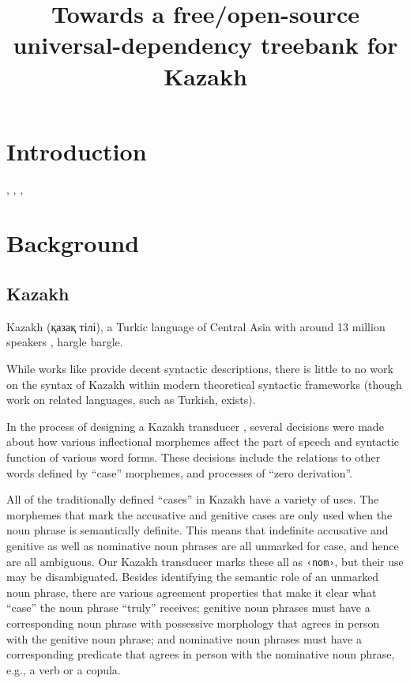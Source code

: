 \documentclass[a4paper,11pt, onecolumn,twoside]{article}
\title{Towards a free/open-source universal-dependency treebank for Kazakh}
\newcommand{\tag}[1]{\texttt{‹#1›}}
\begin{document}
\maketitleabstract{}
\thispagestyle{firststyle}

\section{Introduction}

\textcite{Lynn12}, \textcite{Atalay03}, \textcite{Oflazer03}, \textcite{DeMarneffe14}

\section{Background}

\subsection{Kazakh}\label{sec:kazakh}

Kazakh (қазақ тілі), a Turkic language of Central Asia with around 13 million speakers \parencite{ethnologue}, hargle bargle. %

While works like \textcite{Balaqayev54} provide decent syntactic descriptions, there is little to no work on the syntax of Kazakh within modern theoretical syntactic frameworks (though work on related languages, such as Turkish, exists).

In the process of designing a Kazakh transducer \parencite{Washington14}, several decisions were made about how various inflectional morphemes affect the part of speech and syntactic function of various word forms.  These decisions include the relations to other words defined by ``case'' morphemes, and processes of ``zero derivation''.

All of the traditionally defined ``cases'' in Kazakh have a variety of uses.  The morphemes that mark the accusative and genitive cases are only used when the noun phrase is semantically definite.  This means that indefinite accusative and genitive as well as nominative noun phrases are all unmarked for case, and hence are all ambiguous.  Our Kazakh transducer marks these all as \tag{nom}, but their use may be disambiguated.  Besides identifying the semantic role of an unmarked noun phrase, there are various agreement properties that make it clear what ``case'' the noun phrase ``truly'' receives: genitive noun phrases must have a corresponding noun phrase with possessive morphology that agrees in person with the genitive noun phrase; and nominative noun phrases must have a corresponding predicate that agrees in person with the nominative noun phrase, e.g., a verb or a copula.
\end{document}
